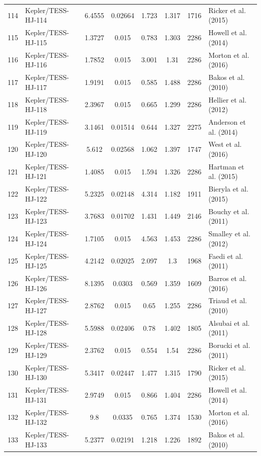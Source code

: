 \begin{longtable}{r l c c c c c p{4.2cm}}
114 & Kepler/TESS-HJ-114 & 6.4555 & 0.02664 & 1.723 & 1.317 & 1716 & Ricker et al. (2015) \\
115 & Kepler/TESS-HJ-115 & 1.3727 & 0.015 & 0.783 & 1.303 & 2286 & Howell et al. (2014) \\
116 & Kepler/TESS-HJ-116 & 1.7852 & 0.015 & 3.001 & 1.31 & 2286 & Morton et al. (2016) \\
117 & Kepler/TESS-HJ-117 & 1.9191 & 0.015 & 0.585 & 1.488 & 2286 & Bakos et al. (2010) \\
118 & Kepler/TESS-HJ-118 & 2.3967 & 0.015 & 0.665 & 1.299 & 2286 & Hellier et al. (2012) \\
119 & Kepler/TESS-HJ-119 & 3.1461 & 0.01514 & 0.644 & 1.327 & 2275 & Anderson et al. (2014) \\
120 & Kepler/TESS-HJ-120 & 5.612 & 0.02568 & 1.062 & 1.397 & 1747 & West et al. (2016) \\
121 & Kepler/TESS-HJ-121 & 1.4085 & 0.015 & 1.594 & 1.326 & 2286 & Hartman et al. (2015) \\
122 & Kepler/TESS-HJ-122 & 5.2325 & 0.02148 & 4.314 & 1.182 & 1911 & Bieryla et al. (2015) \\
123 & Kepler/TESS-HJ-123 & 3.7683 & 0.01702 & 1.431 & 1.449 & 2146 & Bouchy et al. (2011) \\
124 & Kepler/TESS-HJ-124 & 1.7105 & 0.015 & 4.563 & 1.453 & 2286 & Smalley et al. (2012) \\
125 & Kepler/TESS-HJ-125 & 4.2142 & 0.02025 & 2.097 & 1.3 & 1968 & Faedi et al. (2011) \\
126 & Kepler/TESS-HJ-126 & 8.1395 & 0.0303 & 0.569 & 1.359 & 1609 & Barros et al. (2016) \\
127 & Kepler/TESS-HJ-127 & 2.8762 & 0.015 & 0.65 & 1.255 & 2286 & Triaud et al. (2010) \\
128 & Kepler/TESS-HJ-128 & 5.5988 & 0.02406 & 0.78 & 1.402 & 1805 & Alsubai et al. (2011) \\
129 & Kepler/TESS-HJ-129 & 2.3762 & 0.015 & 0.554 & 1.54 & 2286 & Borucki et al. (2011) \\
130 & Kepler/TESS-HJ-130 & 5.3417 & 0.02447 & 1.477 & 1.315 & 1790 & Ricker et al. (2015) \\
131 & Kepler/TESS-HJ-131 & 2.9749 & 0.015 & 0.866 & 1.404 & 2286 & Howell et al. (2014) \\
132 & Kepler/TESS-HJ-132 & 9.8 & 0.0335 & 0.765 & 1.374 & 1530 & Morton et al. (2016) \\
133 & Kepler/TESS-HJ-133 & 5.2377 & 0.02191 & 1.218 & 1.226 & 1892 & Bakos et al. (2010) \\

\end{longtable}
